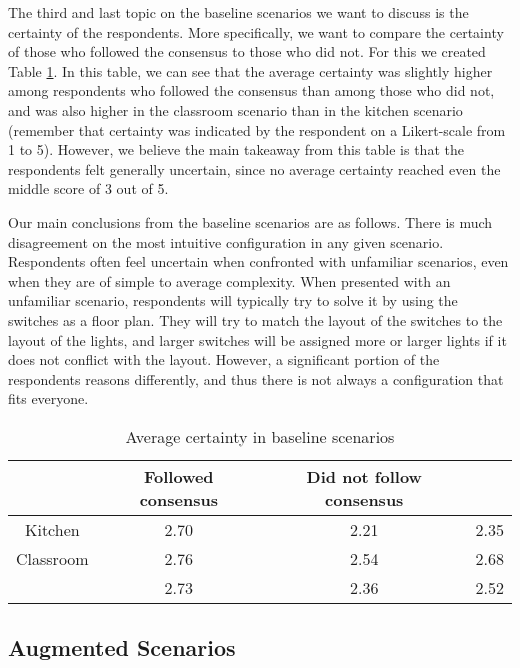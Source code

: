 The third and last topic on the baseline scenarios we want to discuss is the certainty of the respondents. More specifically, we want to compare the certainty of those who followed the consensus to those who did not. For this we created Table \ref{table:preliminary_study_baseline_certainties}. In this table, we can see that the average certainty was slightly higher among respondents who followed the consensus than among those who did not, and was also higher in the classroom scenario than in the kitchen scenario (remember that certainty was indicated by the respondent on a Likert-scale from 1 to 5). However, we believe the main takeaway from this table is that the respondents felt generally uncertain, since no average certainty reached even the middle score of 3 out of 5.

Our main conclusions from the baseline scenarios are as follows. There is much disagreement on the most intuitive configuration in any given scenario. Respondents often feel uncertain when confronted with unfamiliar scenarios, even when they are of simple to average complexity. When presented with an unfamiliar scenario, respondents will typically try to solve it by using the switches as a floor plan. They will try to match the layout of the switches to the layout of the lights, and larger switches will be assigned more or larger lights if it does not conflict with the layout. However, a significant portion of the respondents reasons differently, and thus there is not always a configuration that fits everyone.

\begin{table}[h!]
    \centering
    \begin{tabular}{|c|c c|c|} 
    \hline
              & Followed consensus & Did not follow consensus &      \\
    \hline
    Kitchen   &               2.70 &                     2.21 & 2.35 \\
    Classroom &               2.76 &                     2.54 & 2.68 \\
    \hline
              &               2.73 &                     2.36 & 2.52 \\
    \hline
\end{tabular}
\caption{Average certainty in baseline scenarios}
\label{table:preliminary_study_baseline_certainties}
\end{table}

\subsection{Augmented Scenarios} \label{sec:preliminary_study:augmented_scenarios}


